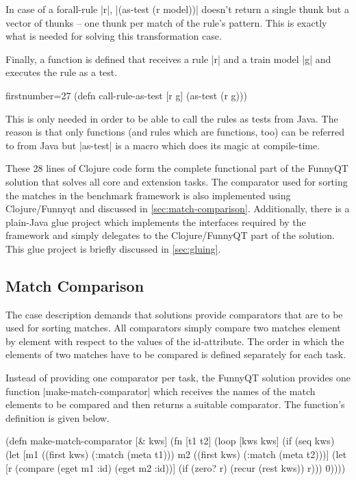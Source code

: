 \documentclass[submission]{eptcs}
\newcommand{\code}{\clojureinline}
\begin{document}
In case of a forall-rule \code|r|, \code|(as-test (r model))| doesn't return a
single thunk but a vector of thunks -- one thunk per match of the rule's
pattern.  This is exactly what is needed for solving this transformation case.

Finally, a function is defined that receives a rule \code|r| and a train model
\code|g| and executes the rule as a test.

\begin{clojurecode*}{firstnumber=27}
(defn call-rule-as-test [r g]
  (as-test (r g)))
\end{clojurecode*}

This is only needed in order to be able to call the rules as tests from Java.
The reason is that only functions (and rules which are functions, too) can be
referred to from Java but \code|as-test| is a macro which does its magic at
compile-time.

These 28 lines of Clojure code form the complete functional part of the FunnyQT
solution that solves all core and extension tasks.  The comparator used for
sorting the matches in the benchmark framework is also implemented using
Clojure/Funnyqt and discussed in \vref{sec:match-comparison}.  Additionally,
there is a plain-Java glue project which implements the interfaces required by
the framework and simply delegates to the Clojure/FunnyQT part of the solution.
This glue project is briefly discussed in \vref{sec:gluing}.


\subsection{Match Comparison}
\label{sec:match-comparison}

The case description demands that solutions provide comparators that are to be
used for sorting matches.  All comparators simply compare two matches element
by element with respect to the values of the \textsf{id}-attribute.  The order
in which the elements of two matches have to be compared is defined separately
for each task.

Instead of providing one comparator per task, the FunnyQT solution provides one
function \code|make-match-comparator| which receives the names of the match
elements to be compared and then returns a suitable comparator.  The function's
definition is given below.

\begin{clojurecode}
(defn make-match-comparator [& kws]
  (fn [t1 t2]
    (loop [kws kws]
      (if (seq kws)
        (let [m1 ((first kws) (:match (meta t1)))
              m2 ((first kws) (:match (meta t2)))]
          (let [r (compare (eget m1 :id) (eget m2 :id))]
            (if (zero? r)
              (recur (rest kws))
              r)))
        0))))
\end{clojurecode}
\end{document}
